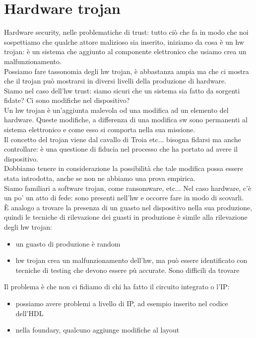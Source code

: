 \documentclass[oneside, 12pt]{extbook}
\begin{document}
\section{Hardware trojan}
Hardware security, nelle problematiche di trust: tutto ciò che fa in modo che noi sospettiamo che qualche attore malizioso sia inserito, iniziamo da cosa è un hw trojan: è un sistema che aggiunto al componente elettronico che usiamo crea un malfunzionamento.
\\Possiamo fare tassonomia degli hw trojan, è abbastanza ampia ma che ci mostra che il trojan può mostrarsi in diversi livelli della produzione di hardware.
\\Siamo nel caso dell'hw trust: siamo sicuri che un sistema sia fatto da sorgenti fidate? Ci sono modifiche nel dispositivo?
\\Un hw trojan è un'aggiunta malevola od una modifica ad un elemento del hardware. Queste modifiche, a differenza di una modifica sw sono permanenti al sistema elettronico e come esso si comporta nella sua missione.
\\Il concetto del trojan viene dal cavallo di Troia etc... bisogna fidarsi ma anche controllare: è una questione di fiducia nel processo che ha portato ad avere il dispositivo.
\\Dobbiamo tenere in considerazione la possibilità che tale modifica possa essere stata introdotta, anche se non ne abbiamo una prova empirica.
\\Siamo familiari a software trojan, come ransomware, etc... Nel caso hardware, c'è un po' un atto di fede: sono presenti nell'hw e occorre fare in modo di scovarli.
\\È analogo a trovare la presenza di un guasto nel dispositivo nella sua produzione, quindi le tecniche di rilevazione dei guasti in produzione è simile alla rilevazione degli hw trojan:
\begin{itemize}
	\item un guasto di produzione è random
	\item hw trojan crea un malfunzionamento dell'hw, ma può essere identificato con tecniche di testing che devono essere pù accurate. Sono difficili da trovare
\end{itemize}
Il problema è che non ci fidiamo di chi ha fatto il circuito integrato o l'IP:
\begin{itemize}
	\item  possiamo avere problemi a livello di IP, ad esempio inserito nel codice dell'HDL
	\item nella foundary, qualcuno aggiunge modifiche al layout 
\end{itemize}
\end{document}
